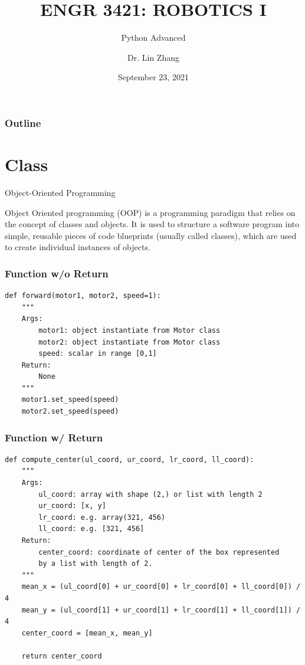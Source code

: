 \documentclass[12pt,letterpaper]{beamer}
\title[Robotics I]
{ENGR 3421: ROBOTICS I}
\subtitle{Python Advanced}
\author[Zhang, Lin]
{Dr. Lin Zhang}
\institute[UCA] %
{
  Department of Physics and Astronomy\\
  University of Central Arkansas
}
\date[Robotics1 2021] %
{September 23, 2021}
\begin{document}
\frame{\titlepage}

\begin{frame}
\frametitle{Outline}
\tableofcontents
\end{frame}

\section{Class}

\begin{frame}{Object-Oriented Programming}

Object Oriented programming (OOP) is a programming paradigm that relies on the concept of classes and objects. 
It is used to structure a software program into simple, reusable pieces of code blueprints (usually called classes), which are used to create individual instances of objects.
\end{frame}

\begin{frame}[fragile]
    \frametitle{Function w/o Return}
        {\scriptsize
        \begin{verbatim}
def forward(motor1, motor2, speed=1):
    """
    Args:
        motor1: object instantiate from Motor class
        motor2: object instantiate from Motor class
        speed: scalar in range [0,1]
    Return:
        None
    """
    motor1.set_speed(speed)
    motor2.set_speed(speed)
        \end{verbatim}
        }
\end{frame}

\begin{frame}[fragile]
    \frametitle{Function w/ Return}

        {\scriptsize
        \begin{verbatim}
def compute_center(ul_coord, ur_coord, lr_coord, ll_coord):
    """
    Args:
        ul_coord: array with shape (2,) or list with length 2
        ur_coord: [x, y]
        lr_coord: e.g. array(321, 456)
        ll_coord: e.g. [321, 456]
    Return:
        center_coord: coordinate of center of the box represented 
        by a list with length of 2.
    """
    mean_x = (ul_coord[0] + ur_coord[0] + lr_coord[0] + ll_coord[0]) / 4
    mean_y = (ul_coord[1] + ur_coord[1] + lr_coord[1] + ll_coord[1]) / 4
    center_coord = [mean_x, mean_y]

    return center_coord
        \end{verbatim}
        }

\end{frame}
\end{document}
